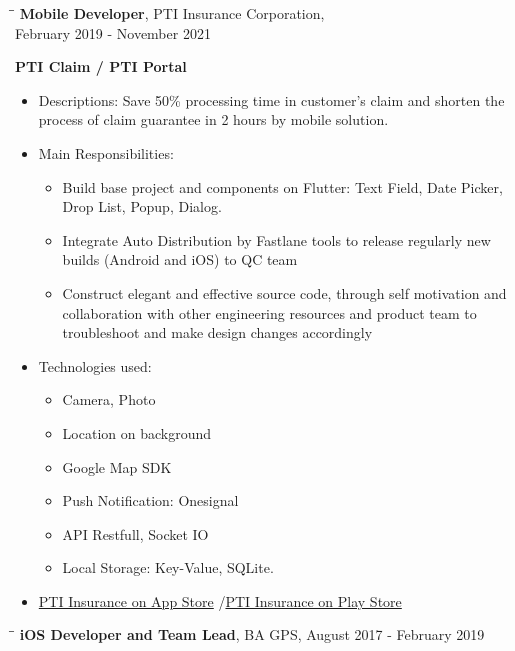 \documentclass[margin, 10pt]{res}
\begin{document}
\begin{resume}
   \begin{tabbing}
   \hspace{2.0in}\= \hspace{2.0in}\= \kill %
   {\bf Mobile Developer}, PTI Insurance Corporation, \\February 2019 - November 2021\\
   \end{tabbing}
	\vspace{-20pt} %
 	{\bf PTI Claim / PTI Portal}
   \begin{itemize}
   	\item Descriptions: Save 50\% processing time in customer’s claim and shorten the process of claim guarantee in 2 hours by mobile solution.
   	\item Main Responsibilities:
   	\begin{itemize}
   		\item Build base project and components on Flutter: Text Field, Date Picker, Drop List, Popup, Dialog.
   		\item Integrate Auto Distribution by Fastlane tools to release regularly new builds (Android and iOS) to QC team
   		\item Construct elegant and effective source code, through self motivation and collaboration with other engineering resources 
		and product team to troubleshoot and make design changes accordingly
	\end{itemize}
	\item Technologies used:
	\begin{itemize}
		\item Camera, Photo
		\item Location on background
		\item Google Map SDK
		\item Push Notification: Onesignal
		\item API Restfull, Socket IO
		\item Local Storage: Key-Value, SQLite.
	\end{itemize}
	
   \item {\color{blue}\href{https://apps.apple.com/us/developer/pti-insurance/id1253321255}{PTI Insurance on App Store}} /{\color{blue}\href{https://play.google.com/store/apps/developer?id=PTI+Insurance}{PTI Insurance on Play Store}}
   \end{itemize}

   \begin{tabbing}
   \hspace{2.0in}\= \hspace{2.0in}\= \kill %
   {\bf iOS Developer and Team Lead}, BA GPS, August 2017 - February 2019\\
   \end{tabbing}\vspace{-20pt} %


\end{resume}
\end{document}
